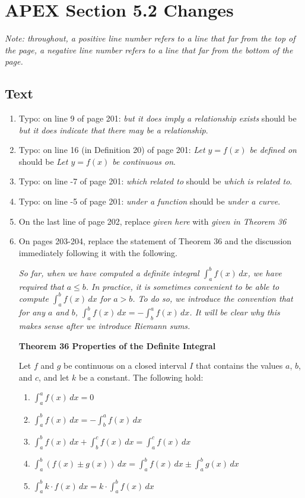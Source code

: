 \documentclass[11pt]{report}
\newcommand{\typo}[4]{\item Typo: on line #2 of page #1: \emph{#3} should be \emph{#4}.}
\begin{document}
\chapter*{APEX Section 5.2 Changes}

{\slshape Note: throughout, a positive line number refers to a line that far from the top of the page, a negative line number refers to a line that far from the bottom of the page.}

\section*{Text}

\begin{enumerate}
\typo{201}{9}{but it does imply a relationship exists}{but it does indicate that there may be a relationship}

\typo{201}{16 (in Definition 20)}{Let $y=f(x)$ be defined on}{Let $y=f(x)$ be continuous on}

\typo{201}{-7}{which related to}{which is related to}

\typo{201}{-5}{under a function}{under a curve}

\item On the last line of page 202, replace \emph{given here} with \emph{given in Theorem 36}

\item On pages 203-204, replace the statement of Theorem 36 and the discussion immediately following it with the following.


{\slshape 
So far, when we have computed a definite integral $\int_a^b f(x)\,dx$, we have required that $a\leq b$. In practice, it is sometimes convenient to be able to compute $\int_a^b f(x)\,dx$ for $a>b$. To do so, we introduce the convention that for any $a$ and $b$, $\int_a^b f(x)\,dx=-\int_b^a f(x)\,dx$. It will be clear why this makes sense after we introduce Riemann sums.

{\bfseries Theorem 36 \quad Properties of the Definite Integral}

Let $f$ and $g$ be continuous on a closed interval $I$ that contains the values $a$, $b$, and $c$, and let $k$ be a constant. The following hold:
\begin{enumerate}
\item $\displaystyle\int_a^a f(x)\,dx=0$
\item $\displaystyle\int_a^b f(x)\,dx=-\int_b^a f(x)\,dx$
\item $\displaystyle\int_a^b f(x)\,dx+\int_b^c f(x)\,dx=\int_a^c f(x)\,dx$
\item $\displaystyle\int_a^b (f(x)\pm g(x))\,dx =\int_a^b f(x)\,dx \pm \int_a^b g(x)\,dx$
\item $\displaystyle\int_a^b k\cdot f(x)\,dx =k\cdot \int_a^b f(x)\,dx$
\end{enumerate}

}
\end{enumerate}
\end{document}
